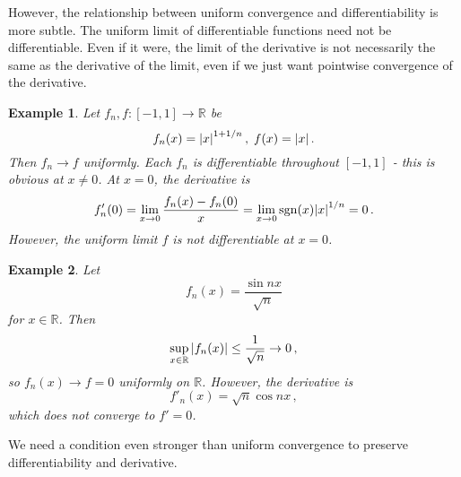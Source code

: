 \documentclass{article}
\theoremstyle{plain}\theoremheaderfont{\normalfont\itshape}\theorembodyfont{\rmfamily}\theoremseparator{.}\newtheorem*{rem}{Remark}\newtheorem*{ex}{Example}\newtheorem*{proof}{Proof}\newtheorem*{altp}{Alternative proof}
\theoremstyle{plain}\theoremheaderfont{\normalfont\bfseries}\theorembodyfont{\rmfamily}\theoremseparator{.}\newtheorem{thm}{Theorem}[section]\newtheorem{lem}[thm]{Lemma}\newtheorem{prop}[thm]{Proposition}\newtheorem*{cor}{Corollary}\newtheorem{defn}[thm]{Definition}\newtheorem{clm}[thm]{Claim}\newtheorem{clminproof}{Claim}
\theoremstyle{break}\theoremheaderfont{\normalfont\itshape}\theorembodyfont{\rmfamily}\theoremseparator{.\medskip}\newtheorem*{proofskip}{Proof}\newtheorem*{exs}{Examples}\newtheorem*{rems}{Remarks}
\theoremstyle{break}\theoremheaderfont{\normalfont\bfseries}\theorembodyfont{\rmfamily}\theoremseparator{.\medskip}\newtheorem{lemskip}[thm]{Lemma}\newtheorem{defnskip}[thm]{Definition}\newtheorem{propskip}[thm]{Proposition}\newtheorem{thmskip}[thm]{Theorem}
\begin{document}
    However, the relationship between uniform convergence and differentiability is more subtle. The uniform limit of differentiable functions need not be differentiable. Even if it were, the limit of the derivative is not necessarily the same as the derivative of the limit, even if we just want pointwise convergence of the derivative.

    \begin{ex}
        Let \(f_n,f:[-1,1]\to\mathbb{R}\) be
        \[f_n(x)=\abs{x}^{1+1/n}\,,\;f(x)=\abs{x}\,.\]
        Then \(f_n\to f\) uniformly. Each \(f_n\) is differentiable throughout \([-1,1]\) - this is obvious at \(x\ne 0\). At \(x=0\), the derivative is
        \[f'_n(0)=\lim_{x\to 0}\frac{f_n(x)-f_n(0)}{x}=\lim_{x\to 0}\mathrm{sgn}(x)\abs{x}^{1/n}=0\,.\]
        However, the uniform limit \(f\) is not differentiable at \(x=0\).
    \end{ex}

    \begin{ex}
        Let
        \[f_n(x)=\frac{\sin nx}{\sqrt{n}}\]
        for \(x\in\mathbb{R}\). Then
        \[\sup_{x\in\mathbb{R}}\abs{f_n(x)}\le\frac{1}{\sqrt{n}}\to 0\,,\]
        so \(f_n(x)\to f=0\) uniformly on \(\mathbb{R}\). However, the derivative is
        \[f'_n(x)=\sqrt{n}\cos nx\,,\]
        which does not converge to \(f'=0\).
    \end{ex}

    We need a condition even stronger than uniform convergence to preserve differentiability and derivative.
\end{document}
